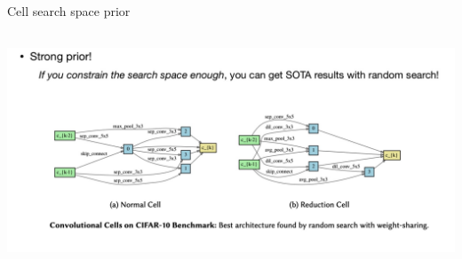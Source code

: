 \begin{frame}{Cell search space prior}

\centering\includegraphics[height=7cm]{image/img200717.jpg}


\end{frame}

